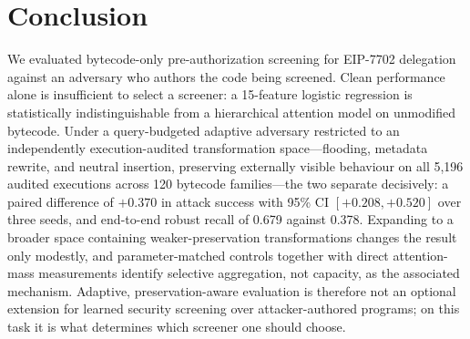 \documentclass[conference]{IEEEtran}
\begin{document}
\section{Conclusion}
\label{sec:conclusion}

We evaluated bytecode-only pre-authorization screening for EIP-7702 delegation against an adversary who authors the code being screened. Clean performance alone is insufficient to select a screener: a 15-feature logistic regression is statistically indistinguishable from a hierarchical attention model on unmodified bytecode. Under a query-budgeted adaptive adversary restricted to an independently execution-audited transformation space---flooding, metadata rewrite, and neutral insertion, preserving externally visible behaviour on all 5,196 audited executions across 120 bytecode families---the two separate decisively: a paired difference of $+0.370$ in attack success with 95\% CI $[+0.208,+0.520]$ over three seeds, and end-to-end robust recall of 0.679 against 0.378. Expanding to a broader space containing weaker-preservation transformations changes the result only modestly, and parameter-matched controls together with direct attention-mass measurements identify selective aggregation, not capacity, as the associated mechanism. Adaptive, preservation-aware evaluation is therefore not an optional extension for learned security screening over attacker-authored programs; on this task it is what determines which screener one should choose.
\end{document}
